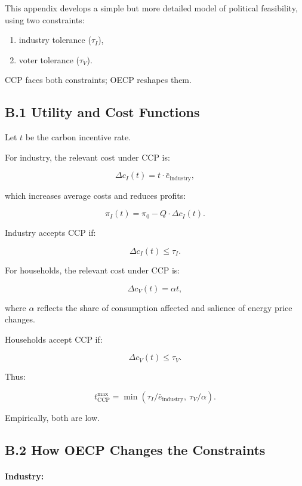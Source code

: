 \documentclass[12pt]{article}
\begin{document}
This appendix develops a simple but more detailed model of political feasibility, 
using two constraints:

\begin{enumerate}
    \item industry tolerance ($\tau_I$),  
    \item voter tolerance ($\tau_V$).
\end{enumerate}

CCP faces both constraints; OECP reshapes them.

\subsection{B.1 Utility and Cost Functions}

Let $t$ be the carbon incentive rate.

For industry, the relevant cost under CCP is:

\[
\Delta c_I(t) = t \cdot \bar e_{\text{industry}},
\]

which increases average costs and reduces profits:

\[
\pi_I(t) = \pi_0 - Q \cdot \Delta c_I(t).
\]

Industry accepts CCP if:

\[
\Delta c_I(t) \le \tau_I.
\]

For households, the relevant cost under CCP is:

\[
\Delta c_V(t) = \alpha t,
\]

where $\alpha$ reflects the share of consumption affected and 
salience of energy price changes.

Households accept CCP if:

\[
\Delta c_V(t) \le \tau_V.
\]

Thus:

\[
t_{\text{CCP}}^{\max} = \min(\tau_I/\bar e_{\text{industry}}, \ \tau_V/\alpha).
\]

Empirically, both are low.

\subsection{B.2 How OECP Changes the Constraints}

\paragraph{Industry:}
\end{document}
